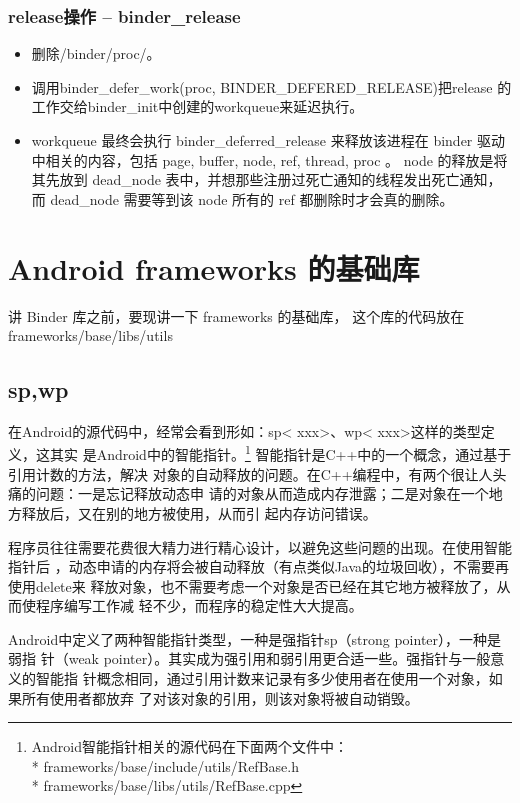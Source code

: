 \documentclass[a4paper,11pt]{article}
\begin{document}
\subsubsection{release操作 -- binder_release}
\begin{itemize}
    \item 删除/binder/proc/。
    \item 调用binder_defer_work(proc, BINDER_DEFERED_RELEASE)把release
        的工作交给binder_init中创建的workqueue来延迟执行。
    \item  workqueue 最终会执行 binder_deferred_release 来释放该进程在
        binder 驱动中相关的内容，包括 page, buffer, node, ref, thread,
        proc 。 node 的释放是将其先放到 dead_node
        表中，并想那些注册过死亡通知的线程发出死亡通知，而 dead_node
        需要等到该 node 所有的 ref 都删除时才会真的删除。
\end{itemize}



\section{Android frameworks 的基础库}
讲 Binder 库之前，要现讲一下 frameworks 的基础库， 这个库的代码放在 
frameworks/base/libs/utils
\subsection{sp,wp}

在Android的源代码中，经常会看到形如：sp< xxx>、wp< xxx>这样的类型定义，这其实
是Android中的智能指针。\footnote{
Android智能指针相关的源代码在下面两个文件中：\\*
frameworks/base/include/utils/RefBase.h\\*
frameworks/base/libs/utils/RefBase.cpp
}
智能指针是C++中的一个概念，通过基于引用计数的方法，解决
对象的自动释放的问题。在C++编程中，有两个很让人头痛的问题：一是忘记释放动态申
请的对象从而造成内存泄露；二是对象在一个地方释放后，又在别的地方被使用，从而引
起内存访问错误。

程序员往往需要花费很大精力进行精心设计，以避免这些问题的出现。在使用智能指针后
，动态申请的内存将会被自动释放（有点类似Java的垃圾回收），不需要再使用delete来
释放对象，也不需要考虑一个对象是否已经在其它地方被释放了，从而使程序编写工作减
轻不少，而程序的稳定性大大提高。


Android中定义了两种智能指针类型，一种是强指针sp（strong pointer），一种是弱指
针（weak pointer）。其实成为强引用和弱引用更合适一些。强指针与一般意义的智能指
针概念相同，通过引用计数来记录有多少使用者在使用一个对象，如果所有使用者都放弃
了对该对象的引用，则该对象将被自动销毁。
\end{document}
